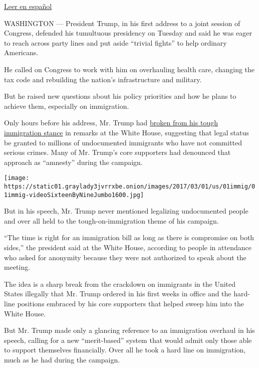\href{https://www.nytimes3xbfgragh.onion/es/2017/03/01/ante-el-congreso-trump-suaviza-su-tono-y-hace-un-llamado-para-acabar-con-las-peleas-triviales/}{Leer
en español}

WASHINGTON --- President Trump, in his first address to a joint session
of Congress, defended his tumultuous presidency on Tuesday and said he
was eager to reach across party lines and put aside ``trivial fights''
to help ordinary Americans.

He called on Congress to work with him on overhauling health care,
changing the tax code and rebuilding the nation's infrastructure and
military.

But he raised new questions about his policy priorities and how he plans
to achieve them, especially on immigration.

Only hours before his address, Mr. Trump had
\href{https://www.nytimes3xbfgragh.onion/2017/03/01/us/politics/trump-undocumented-immigrants.html}{broken
from his tough immigration stance} in remarks at the White House,
suggesting that legal status be granted to millions of undocumented
immigrants who have not committed serious crimes. Many of Mr. Trump's
core supporters had denounced that approach as ``amnesty'' during the
campaign.

\texttt{[image: https://static01.graylady3jvrrxbe.onion/images/2017/03/01/us/01immig/01immig-videoSixteenByNineJumbo1600.jpg]}

But in his speech, Mr. Trump never mentioned legalizing undocumented
people and over all held to the tough-on-immigration theme of his
campaign.

``The time is right for an immigration bill as long as there is
compromise on both sides,'' the president said at the White House,
according to people in attendance who asked for anonymity because they
were not authorized to speak about the meeting.

The idea is a sharp break from the crackdown on immigrants in the United
States illegally that Mr. Trump ordered in his first weeks in office and
the hard-line positions embraced by his core supporters that helped
sweep him into the White House.

But Mr. Trump made only a glancing reference to an immigration overhaul
in his speech, calling for a new ``merit-based'' system that would admit
only those able to support themselves financially. Over all he took a
hard line on immigration, much as he had during the campaign.

\href{https://www.nytimes3xbfgragh.onion/interactive/2017/02/28/us/politics/trump-congress-address-live-video-analysis.html}{}

